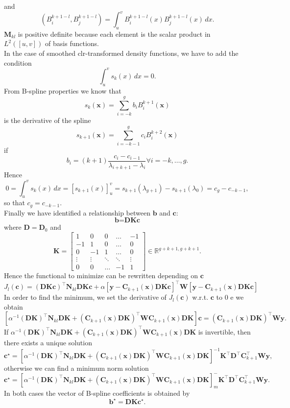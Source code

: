 and \[(B_{i}^{k+1-l}, B_{j}^{k+1-l}) = \int_u^v B_{i}^{k+1-l}(x)B_{j}^{k+1-l}(x) \, dx.\]
$\textbf{M}_{kl}$ is positive definite because each element is the scalar product in $L^2([u,v])$ of basis functions. \\
In the case of  smoothed clr-transformed density functions, we have to add the condition
\[\int_u^v s_k(x) \, dx = 0.\] 
From B-spline properties we know that 
\[  s_k(\textbf{x})=\sum\limits_{i=-k}^{g}b_iB_i^{k+1}(\textbf{x}) \]
is the derivative of the spline
\[  s_{k+1}(\textbf{x})=\sum\limits_{i=-k-1}^{g}c_iB_i^{k+2}(\textbf{x}) \]
if
\[b_i = (k+1)\frac{c_i-c_{i-1}}{\lambda_{i+k+1}-\lambda_{i}} \forall i = -k, \dots, g.\]
Hence 
\[ 0 = \int_u^v s_k(x) \, dx = [s_{k+1}(x)]_u^v = s_{k+1}(\lambda_{g+1})-s_{k+1}(\lambda_{0}) = c_g-c_{-k-1},\]
so that $c_g = c_{-k-1}$.\\
Finally we have identified a relationship between $\textbf{b}$ and $\textbf{c}$:
\[\textbf{b} = \textbf{D}\textbf{K}\textbf{c}\] 
where $ \textbf{D} = \textbf{D}_0$ and
\[  \textbf{K} =
\begin{bmatrix}
1 &0&0& \dots  & -1 \\
-1 &1&0& \dots  & 0 \\
0 &-1&1& \dots  & 0 \\
\vdots &\vdots & \ddots & \ddots& \vdots \\
0 &0 & \dots&-1  & 1
\end{bmatrix} \in \mathbb{R}^{g+k+1, g+k+1}. \]
Hence the functional to minimize can be rewritten depending on $\textbf{c}$
\[J_l(\textbf{c}) = (\textbf{D}\textbf{K}\textbf{c})^\top \textbf{N}_{kl}\textbf{D}\textbf{K}\textbf{c} + \alpha [\textbf{y}-\textbf{C}_{k+1}(\textbf{x})\textbf{D}\textbf{K}\textbf{c}]^\top \textbf{W} [\textbf{y}-\textbf{C}_{k+1}(\textbf{x})\textbf{D}\textbf{K}\textbf{c}]\]
In order to find the minimum, we set the derivative of $J_l(\textbf{c})$ w.r.t. $\textbf{c}$ to 0 e we obtain
\[ [\alpha^{-1}(\textbf{D}\textbf{K})^\top \textbf{N}_{kl} \textbf{D}\textbf{K}+ (\textbf{C}_{k+1}(\textbf{x})\textbf{D}\textbf{K})^\top\textbf{W}\textbf{C}_{k+1}(\textbf{x})\textbf{D}\textbf{K}]\textbf{c} = (\textbf{C}_{k+1}(\textbf{x})\textbf{D}\textbf{K})^\top \textbf{W}\textbf{y}.\]
If $\alpha^{-1}(\textbf{D}\textbf{K})^\top \textbf{N}_{kl} \textbf{D}\textbf{K}+ (\textbf{C}_{k+1}(\textbf{x})\textbf{D}\textbf{K})^\top\textbf{W}\textbf{C}_{k+1}(\textbf{x})\textbf{D}\textbf{K}$ is invertible, then there exists a unique solution 
\[\textbf{c}^\star = [\alpha^{-1}(\textbf{D}\textbf{K})^\top \textbf{N}_{kl} \textbf{D}\textbf{K}+ (\textbf{C}_{k+1}(\textbf{x})\textbf{D}\textbf{K})^\top\textbf{W}\textbf{C}_{k+1}(\textbf{x})\textbf{D}\textbf{K}]^{-1}\textbf{K}^\top\textbf{D}^\top\textbf{C}_{k+1}^\top \textbf{W}\textbf{y},\]
otherwise we can find a minimum norm solution
\[\textbf{c}^\star = [\alpha^{-1}(\textbf{D}\textbf{K})^\top \textbf{N}_{kl} \textbf{D}\textbf{K}+ (\textbf{C}_{k+1}(\textbf{x})\textbf{D}\textbf{K})^\top\textbf{W}\textbf{C}_{k+1}(\textbf{x})\textbf{D}\textbf{K}]_{m}^{-}\textbf{K}^\top\textbf{D}^\top\textbf{C}_{k+1}^\top \textbf{W}\textbf{y}.\]
In both cases the vector of B-spline coefficients is obtained by
\[\textbf{b}^\star = \textbf{D}\textbf{K}\textbf{c}^\star.\] 



